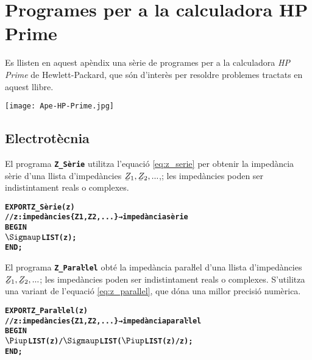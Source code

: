 \chapter{Programes per a la calculadora HP Prime}

Es llisten en aquest apèndix una sèrie de programes per a la calculadora \emph{HP Prime} de Hewlett-Packard, que són d'interès per resoldre problemes tractats en aquest llibre.

\begin{center}
\texttt{[image: Ape-HP-Prime.jpg]}
\end{center}

\section{Electrotècnia}\label{sec:HP_ELC}

El programa \texttt{\textbf{Z\_Sèrie}} utilitza l'equació \eqref{eq:z_serie} per obtenir la impedància sèrie d'una llista d'impedàncies $\cmplx{Z}_1, \cmplx{Z}_2, ...$,; les impedàncies poden ser indistintament reals o complexes.
\vspace{-6mm}
\begin{alltt}
\bfseries
{}
    EXPORT Z_Sèrie(z)
    // z:impedàncies \{Z1, Z2, ...\} → impedància sèrie
    BEGIN
      \(\Sigmaup\)LIST(z);
    END;
\end{alltt}

El programa \texttt{\textbf{Z\_Paraŀlel}} obté la impedància paraŀlel  d'una llista d'impedàncies $\cmplx{Z}_1, \cmplx{Z}_2, ...$; les impedàncies poden ser indistintament reals o complexes. S'utilitza una variant de l'equació \eqref{eq:z_parallel}, que dóna una millor precisió numèrica.
\vspace{-6mm}
\begin{alltt}
\bfseries
{}
    EXPORT Z_Paraŀlel(z)
    // z:impedàncies \{Z1, Z2, ...\} → impedància paraŀlel
    BEGIN
      \(\Piup\)LIST(z)/\(\Sigmaup\)LIST(\(\Piup\)LIST(z)/z);
    END;
\end{alltt}

